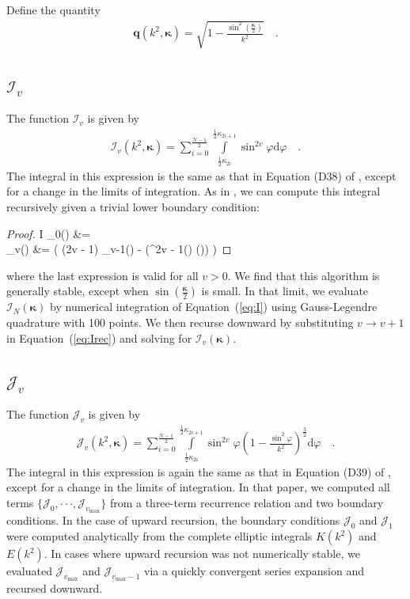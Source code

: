 \documentclass[modern]{aastex62}
\newcommand{\STARRYQUADPOINTS}{100\xspace}
\newcommand{\kap}{\boldsymbol{\kappa}}
\newcommand{\vmax}{{v_\mathrm{max}}}
\begin{document}
Define the quantity
%
\begin{align}
    \label{eq:q}
    \mathbf{q}(k^2, \kap) = \sqrt{1 - \frac{\sin^2\left(\frac{\kap}{2}\right)}{k^2}}
    \quad.
\end{align}

\subsection{$\mathcal{I}_v$}
%
The function $\mathcal{I}_v$ is given by
%
\begin{align}
    \label{eq:I}
    \mathcal{I}_v(k^2, \kap) =
    \sum_{i = 0}^{\frac{N - 1}{2}}
    \int\limits_{\frac{1}{2}\kappa_{2i}}^{\frac{1}{2}\kappa_{2i+1}}
    \sin^{2v}\varphi
    \mathrm{d}\varphi
    \quad.
\end{align}
%
The integral in this expression is the same as that in Equation (D38)
of \citet{Luger2019}, except for a change in the limits of integration.
As in \citet{Luger2019}, we can compute this integral recursively given
a trivial lower boundary condition:
%
\begin{proof}{I}
    \label{eq:Irec}
    _0(\kap) &=
    \frac{\Delta \kap}{2}
    \nonumber \\
    _v(\kap) &=
    \bigg(
    (2v - 1) _{v-1}(\kap) -
    \Delta \left(\sin^{2v - 1}\left(\frac{\kap}{2}\right)
    \cos\left(\frac{\kap}{2}\right)\right)
    \bigg)
\end{proof}
%
where the last expression is valid for all $v > 0$. We find that this algorithm
is generally stable, except when $\sin\left(\frac{\kap}{2}\right)$ is small. In
that limit, we evaluate $\mathcal{I}_N(\kap)$ by numerical integration of
Equation~(\ref{eq:I}) using Gauss-Legendre quadrature with \STARRYQUADPOINTS
points. We then recurse downward by substituting $v \rightarrow v + 1$ in
Equation~(\ref{eq:Irec}) and solving for $\mathcal{I}_v(\kap)$.

\subsection{$\mathcal{J}_v$}
%
The function $\mathcal{J}_v$ is given by
%
\begin{align}
    \label{eq:J}
    \mathcal{J}_v(k^2, \kap) =
    \sum_{i = 0}^{\frac{N - 1}{2}}
    \int\limits_{\frac{1}{2}\kappa_{2i}}^{\frac{1}{2}\kappa_{2i+1}}
    \sin^{2v}\varphi
    \left(1 - \frac{\sin^2\varphi}{k^2}\right)^\frac{3}{2}
    \mathrm{d}\varphi
    \quad.
\end{align}
%
The integral in this expression is again the same as that in Equation (D39)
of \citet{Luger2019}, except for a change in the limits of integration.
In that paper, we computed all terms
$\{ \mathcal{J}_0, {\cdot\cdot\cdot}, \mathcal{J}_\vmax \}$ from a three-term
recurrence relation and two boundary conditions. In the case of upward
recursion, the boundary conditions $\mathcal{J}_0$ and $\mathcal{J}_1$ were
computed analytically from the complete elliptic integrals $K(k^2)$
and $E(k^2)$. In cases where upward recursion was not numerically stable, we
evaluated $\mathcal{J}_\vmax$ and $\mathcal{J}_{\vmax-1}$
via a quickly convergent series expansion and recursed downward.
\end{document}
